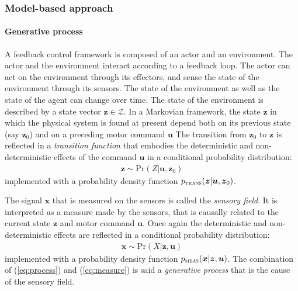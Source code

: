 \documentclass[12pt,twoside,openright]{article}
\begin{document}
\subsubsection{Model-based approach}
\paragraph{Generative process}
A feedback control framework is composed of an actor and an environment. The actor and the environment interact according to a feedback loop. 
The actor can act on the environment through its effectors, and sense the state of the environment through its sensors. 
The state of the environment as well as the state of the agent can change over time. The state of the environment is described by a state vector $\boldsymbol{z} \in \mathcal{Z}$.
In a Markovian framework, the state $\boldsymbol{z}$ in which the physical system is found at present depend both on its previous state (say $\boldsymbol{z}_0$) and on a preceding motor command $\boldsymbol{u}$ 
The transition from $\boldsymbol{z}_0$ to $\boldsymbol{z}$ is reflected in a \emph{transition function} that embodies the deterministic and non-deterministic effects of the command $\boldsymbol{u}$ in a conditional probability distribution:  
\begin{align}
\boldsymbol{z} \sim \text{Pr}(Z|\boldsymbol{u},\boldsymbol{z}_0) \label{eq:process}
\end{align}
implemented with a probability density function 
$p_\text{\sc trans}(\boldsymbol{z}|\boldsymbol{u},\boldsymbol{z}_0)$.


The signal $\boldsymbol{x}$ that is measured on the sensors is called the \emph{sensory field}. It is interpreted as a measure made by the sensors, that is causally related to the current state $\boldsymbol{z}$ and motor command $\boldsymbol{u}$. Once again the deterministic and non-deterministic effects are reflected in a conditional probability distribution:
\begin{align}
\boldsymbol{x} \sim \text{Pr}(X|\boldsymbol{z},\boldsymbol{u})\label{eq:measure}
\end{align}
implemented with a probability density function 
$p_\text{\sc meas}(\boldsymbol{x}|\boldsymbol{z},\boldsymbol{u})$.
The combination of  (\ref{eq:process}) and (\ref{eq:measure}) is said a \emph{generative process} that is the cause of the sensory field. 

\end{document}
